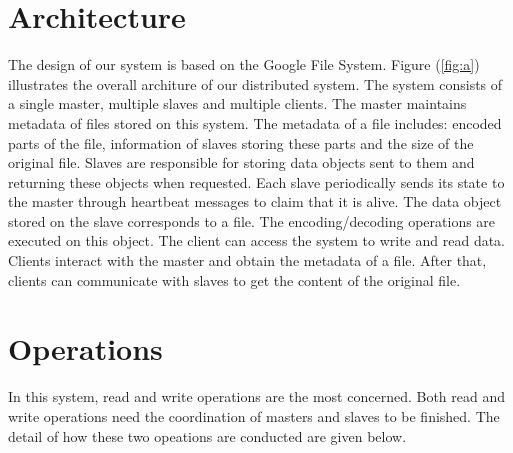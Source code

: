 \documentclass[conference]{IEEEtran}
\begin{document}




%
\IEEEpeerreviewmaketitle

\section{Architecture}
The design of our system is based on the Google File System\cite{gfs}. Figure (\ref{fig:a}) illustrates the overall architure of our distributed system.
The system consists of a single master, multiple slaves and  multiple clients. The master maintains metadata of files stored on this system. The metadata of a file includes: encoded parts of the file, information of slaves storing these parts and the size of the original file. Slaves are responsible for storing data objects sent to them and returning these objects when requested. Each slave periodically sends its state to the master through heartbeat messages to claim that it is alive. The data object stored on the slave corresponds to a file. The encoding/decoding operations are executed on this object. The client can access the system to write and read data.
Clients interact with the master and obtain the metadata of a file. After that, clients can communicate with slaves to get the content of the original file.

\section{Operations}
In this system, read and write operations are the most concerned. Both read and write operations need the coordination of masters and slaves to be finished. The detail of how these two opeations are conducted are given below.
\end{document}
